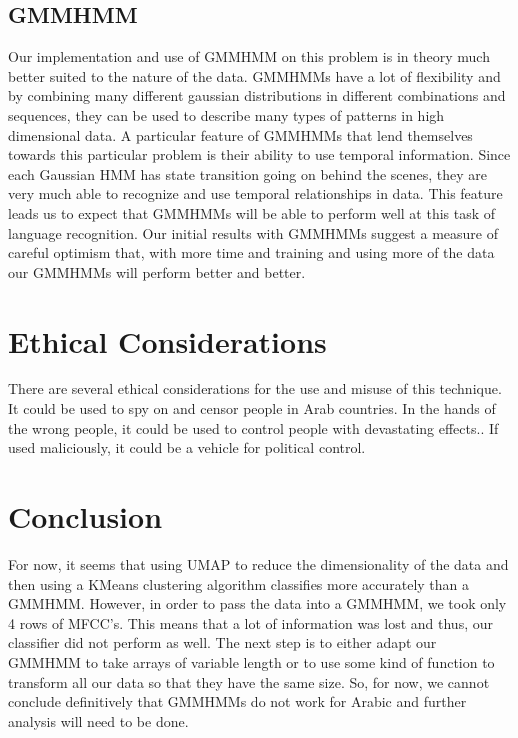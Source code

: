 \documentclass[11pt]{article}
\newcommand{\0}{{\vec  0 }}
\newcommand{\1}{{\mathbbm{  1} }}
\begin{document}
    \subsection{GMMHMM}
    Our implementation and use of GMMHMM on this problem is in theory much better suited to the nature of the data. GMMHMMs have a lot of flexibility and by combining many different gaussian distributions in different combinations and sequences, they can be used to describe many types of patterns in high dimensional data. A particular feature of GMMHMMs that lend themselves towards this particular problem is their ability to use temporal information. Since each Gaussian HMM has state transition going on behind the scenes, they are very much able to recognize and use temporal relationships in data. This feature leads us to expect that GMMHMMs will be able to perform well at this task of language recognition. 
    Our initial results with GMMHMMs suggest a measure of careful optimism that, with more time and training and using more of the data our GMMHMMs will perform better and better. 
    
    \section{Ethical Considerations}
    There are several ethical considerations for the use and misuse of this technique. It could be used to spy on and censor people in Arab countries. In the hands of the wrong people, it could be used to control people with devastating effects.. If used maliciously, it could be a vehicle for political control. 
    
    \section{Conclusion}
    For now, it seems that using UMAP to reduce the dimensionality of the data and then using a KMeans clustering algorithm classifies more accurately than a GMMHMM. However, in order to pass the data into a GMMHMM, we took only 4 rows of MFCC’s. This means that a lot of information was lost and thus, our classifier did not perform as well. The next step is to either adapt our GMMHMM to take arrays of variable length or to use some kind of function to transform all our data so that they have the same size. So, for now, we cannot conclude definitively that GMMHMMs do not work for Arabic and further analysis will need to be done.
    

    
    

    
    
\end{document}

